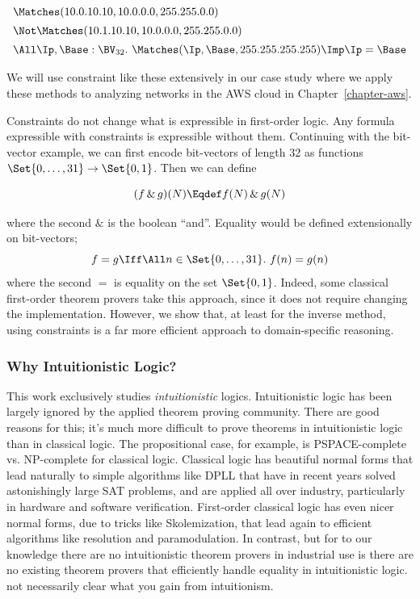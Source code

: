 \[
\begin{array}{l}
  \Matches(10.0.10.10, 10.0.0.0, 255.255.0.0)
  \\[5pt]
  \Not\Matches(10.1.10.10, 10.0.0.0, 255.255.0.0)
  \\[5pt]
  \All\Ip, \Base: \BV_{32}.\
  \Matches(\Ip, \Base, 255.255.255.255) \Imp \Ip = \Base
\end{array}
\]

\noindent
We will use constraint like these extensively in our case
study where we apply these methods to analyzing networks in the
AWS cloud in Chapter~\ref{chapter-aws}.

Constraints do not change what is expressible in first-order logic.  Any formula
expressible with constraints is expressible without them.  Continuing with the
bit-vector example, we can first encode bit-vectors of length 32 as functions
$\Set{0, \ldots, 31} \to \Set{0, 1}$.  Then we can define

\[
(f\,\&\,g)(N) \Eqdef f(N)\,\&\,g(N)
\]

\noindent where the second $\&$ is the boolean
``and''.  Equality would be defined extensionally on bit-vectors;
\[f = g \Iff \All n\in\Set{0,\ldots, 31}.\ f(n) = g(n)\] where the second $=$ is
equality on the set $\Set{0,1}$.  Indeed, some classical first-order theorem
provers take this approach, since it does not require changing the
implementation.  However, we show that, at least for the
inverse method, using constraints is a far more efficient approach to
domain-specific reasoning.

\subsubsection*{Why Intuitionistic Logic?}

This work exclusively studies \emph{intuitionistic} logics.  Intuitionistic
logic has been largely ignored by the applied theorem proving community.  There
are good reasons for this; it's much more difficult to prove theorems in
intuitionistic logic than in classical logic.  The propositional case, for
example, is PSPACE-complete vs. NP-complete for classical logic.  Classical
logic has beautiful normal forms that lead naturally to simple algorithms like
DPLL that have in recent years solved astonishingly large SAT problems, and are
applied all over industry, particularly in hardware and software verification.
First-order classical logic has even nicer normal forms, due to tricks like
Skolemization, that lead again to efficient algorithms like resolution and
paramodulation.  In contrast, but for to our knowledge there are no intuitionistic
theorem provers in industrial use is there are no existing theorem provers that
efficiently handle equality in intuitionistic logic.   not necessarily
clear what you gain from
intuitionism.

